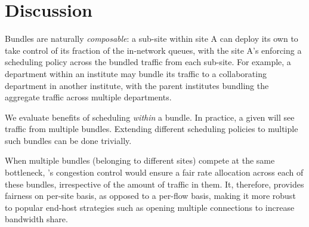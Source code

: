 \section{Discussion}\label{s:discussion}

 Bundles are naturally \emph{composable}: a sub-site within site A can deploy its own \name to take control of its fraction of the in-network queues, with the site A's \name enforcing a scheduling policy across the bundled traffic from each sub-site.  
For example, a department within an institute may bundle its traffic to a collaborating department in another institute, with the parent institutes bundling the aggregate traffic across multiple departments.

 We evaluate benefits of scheduling \emph{within} a bundle. In practice, a given \inbox will see traffic from multiple bundles. Extending different scheduling policies to multiple such bundles can be done trivially.

 When multiple bundles (belonging to different sites) compete at the same bottleneck, \name's congestion control would ensure a fair rate allocation across each of these bundles, irrespective of the amount of traffic in them. It, therefore, provides fairness on per-site basis, as opposed to a per-flow basis, making it more robust to popular end-host strategies such as opening multiple connections to increase bandwidth share. 

